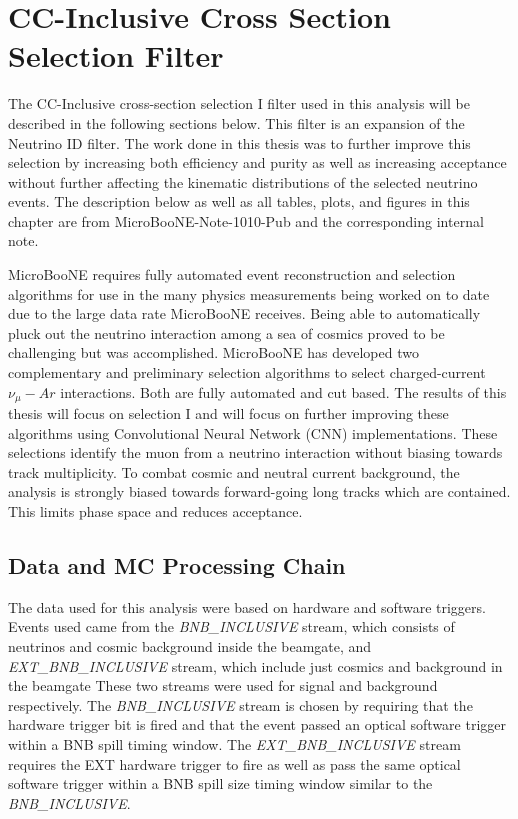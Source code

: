 \chapter{CC-Inclusive Cross Section Selection Filter} \label{ch:meas}
The CC-Inclusive cross-section selection I filter used in this analysis will be described in the following sections below. This filter is an expansion of the Neutrino ID filter. The work done in this thesis was to further improve this selection by increasing both efficiency and purity as well as increasing acceptance without further affecting the kinematic distributions of the selected neutrino events. The description below as well as all tables, plots, and figures in this chapter are from MicroBooNE-Note-1010-Pub \cite{cc-inclusive} and the corresponding internal note. 
 
MicroBooNE requires fully automated event reconstruction and selection algorithms for use in the many physics measurements being worked on to date due to the large data rate MicroBooNE receives. Being able to automatically pluck out the neutrino interaction among a sea of cosmics proved to be challenging but was accomplished. MicroBooNE has developed two complementary and preliminary selection algorithms to select charged-current $\nu_{\mu}-Ar$ interactions. Both are fully automated and cut based. The results of this thesis will focus on selection I and will focus on further improving these algorithms using Convolutional Neural Network (CNN) implementations. These selections identify the muon from a neutrino interaction without biasing towards track multiplicity. To combat cosmic and neutral current background, the analysis is strongly biased towards forward-going long tracks which are contained. This limits phase space and reduces acceptance. 

\section{Data and MC Processing Chain}
The data used for this analysis were based on hardware and software triggers. Events used came from the \textit{BNB\_INCLUSIVE} stream, which consists of neutrinos and cosmic background inside the beamgate, and \textit{EXT\_BNB\_INCLUSIVE} stream, which include just cosmics and background in the beamgate These two streams were used for signal and background respectively. The \textit{BNB\_INCLUSIVE} stream is chosen by requiring that the hardware trigger bit is fired and that the event passed an optical software trigger within a BNB spill timing window. The \textit{EXT\_BNB\_INCLUSIVE} stream requires the EXT hardware trigger to fire as well as pass the same optical software trigger within a BNB spill size timing window similar to the \textit{BNB\_INCLUSIVE}. 

